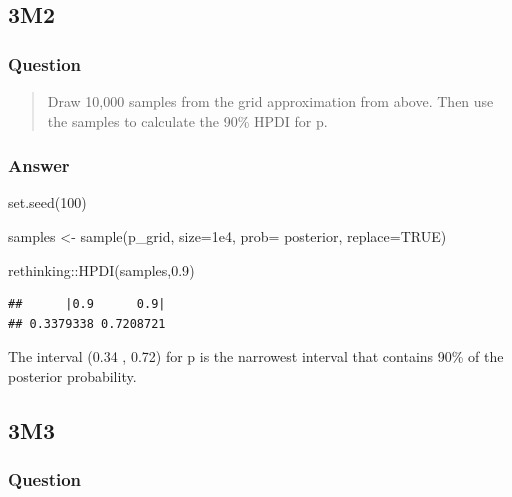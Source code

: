 \documentclass[
]{book}
\newenvironment{Shaded}{\begin{snugshade}}{\end{snugshade}}
\newcommand{\AttributeTok}[1]{\textcolor[rgb]{0.77,0.63,0.00}{#1}}
\newcommand{\ConstantTok}[1]{\textcolor[rgb]{0.00,0.00,0.00}{#1}}
\newcommand{\DecValTok}[1]{\textcolor[rgb]{0.00,0.00,0.81}{#1}}
\newcommand{\FloatTok}[1]{\textcolor[rgb]{0.00,0.00,0.81}{#1}}
\newcommand{\FunctionTok}[1]{\textcolor[rgb]{0.00,0.00,0.00}{#1}}
\newcommand{\NormalTok}[1]{#1}
\newcommand{\OtherTok}[1]{\textcolor[rgb]{0.56,0.35,0.01}{#1}}
\newcommand{\SpecialCharTok}[1]{\textcolor[rgb]{0.00,0.00,0.00}{#1}}
\begin{document}
\hypertarget{m2-1}{%
\subsection*{3M2}\label{m2-1}}

\hypertarget{question-23}{%
\subsubsection*{Question}\label{question-23}}

\begin{quote}
Draw 10,000 samples from the grid approximation from above. Then use the samples to calculate the 90\% HPDI for p.
\end{quote}

\hypertarget{answer-23}{%
\subsubsection*{Answer}\label{answer-23}}

\begin{Shaded}
\begin{Highlighting}[]
\FunctionTok{set.seed}\NormalTok{(}\DecValTok{100}\NormalTok{) }

\NormalTok{samples }\OtherTok{\textless{}{-}} \FunctionTok{sample}\NormalTok{(p\_grid, }\AttributeTok{size=}\FloatTok{1e4}\NormalTok{, }\AttributeTok{prob=}\NormalTok{ posterior, }\AttributeTok{replace=}\ConstantTok{TRUE}\NormalTok{)}

\NormalTok{rethinking}\SpecialCharTok{::}\FunctionTok{HPDI}\NormalTok{(samples,}\FloatTok{0.9}\NormalTok{)}
\end{Highlighting}
\end{Shaded}

\begin{verbatim}
##      |0.9      0.9| 
## 0.3379338 0.7208721
\end{verbatim}

The interval (0.34 , 0.72) for p is the narrowest interval that contains 90\% of the posterior probability.

\hypertarget{m3-1}{%
\subsection*{3M3}\label{m3-1}}

\hypertarget{question-24}{%
\subsubsection*{Question}\label{question-24}}
\end{document}
